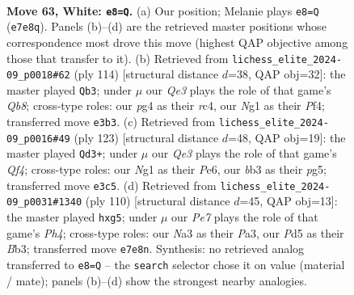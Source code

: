 \documentclass[11pt]{article}
\begin{document}
\clearpage

\begin{figure}[p]\centering
\begin{subfigure}{0.46\textwidth}\centering
\resizebox{\linewidth}{!}{%
\newchessgame
\chessboard[
  setfen={8/4P3/p4k2/3P3p/6p1/Nb2Q3/5P1q/5KN1 w - - 5 63},
  showmover=false,
  pgfstyle=straightmove, color=movearrow, markmove={e7-e8}
]}
\caption{}
\end{subfigure}\hfill
\begin{subfigure}{0.46\textwidth}\centering
\resizebox{\linewidth}{!}{%
\newchessgame
\chessboard[
  setfen={1Q6/p7/k3p1N1/5q2/2r2P2/7P/6PK/8 w - - 14 58},
  showmover=false,
  pgfstyle=straightmove, color=movearrow, markmove={b8-b3}
]}
\caption{}
\end{subfigure}
\\[4pt]
\begin{subfigure}{0.46\textwidth}\centering
\resizebox{\linewidth}{!}{%
\newchessgame
\chessboard[
  setfen={6k1/4Q2p/p3p1p1/5qP1/P6P/6K1/8/8 b - - 5 62},
  showmover=false,
  pgfstyle=straightmove, color=movearrow, markmove={f5-d3}
]}
\caption{}
\end{subfigure}\hfill
\begin{subfigure}{0.46\textwidth}\centering
\resizebox{\linewidth}{!}{%
\newchessgame
\chessboard[
  setfen={5k2/2Q5/2N2q2/6pp/3P3P/PB2P3/6P1/6K1 w - - 0 56},
  showmover=false,
  pgfstyle=straightmove, color=movearrow, markmove={h4-g5}
]}
\caption{}
\end{subfigure}
\caption{\textbf{Move 63, White: \texttt{e8=Q}.} (a) Our position; Melanie plays \texttt{e8=Q} (\texttt{e7e8q}). Panels (b)--(d) are the retrieved master positions whose correspondence most drove this move (highest QAP objective among those that transfer to it). (b) Retrieved from \texttt{lichess\_elite\_2024-09\_p0018\#62} (ply 114) [structural distance $d$=38, QAP obj=32]: the master played \texttt{Qb3}; under $\mu$ our \emph{Qe3} plays the role of that game's \emph{Qb8}; cross-type roles: our \emph{p}g4 as their \emph{r}c4, our \emph{N}g1 as their \emph{P}f4; transferred move \texttt{e3b3}. (c) Retrieved from \texttt{lichess\_elite\_2024-09\_p0016\#49} (ply 123) [structural distance $d$=48, QAP obj=19]: the master played \texttt{Qd3+}; under $\mu$ our \emph{Qe3} plays the role of that game's \emph{Qf4}; cross-type roles: our \emph{N}g1 as their \emph{P}e6, our \emph{b}b3 as their \emph{p}g5; transferred move \texttt{e3c5}. (d) Retrieved from \texttt{lichess\_elite\_2024-09\_p0031\#1340} (ply 110) [structural distance $d$=45, QAP obj=13]: the master played \texttt{hxg5}; under $\mu$ our \emph{Pe7} plays the role of that game's \emph{Ph4}; cross-type roles: our \emph{N}a3 as their \emph{P}a3, our \emph{P}d5 as their \emph{B}b3; transferred move \texttt{e7e8n}. Synthesis: no retrieved analog transferred to \texttt{e8=Q} -- the \texttt{search} selector chose it on value (material / mate); panels (b)--(d) show the strongest nearby analogies.}
\label{fig:thought-m124}
\end{figure}
\end{document}

